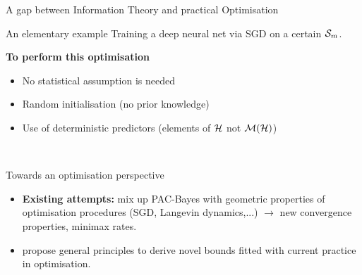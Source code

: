 \documentclass{presentation}
\begin{document}
\begin{xframe}{A gap between Information Theory and practical Optimisation}
    \begin{block}{An elementary example}
        Training a deep neural net via SGD on a certain $\mathcal{S}_m$.
    \end{block}
\vspace{0.5cm}
{\bf To perform this optimisation}
    \begin{itemize}
        \item No statistical assumption is needed
        \item Random initialisation (no prior knowledge)
        \item Use of deterministic predictors (elements of $\mathcal{H}$ not $\mathcal{M}(\mathcal{H})$)
    \end{itemize}
    \vspace{0.5cm}
    \\
    \vspace{0.5cm}
\end{xframe}

\begin{xframe}{Towards an optimisation perspective}
    \vspace{1cm}
    \begin{itemize}
        \item \textbf{Existing attempts:} mix up PAC-Bayes with geometric properties of optimisation procedures (SGD, Langevin dynamics,...)  \citep{london2017pac,dziugaite2018entropy,neu2021info,clerico2022generalisation,haghifam2023limit,zhou2023toward} $\rightarrow$ new convergence properties, minimax rates.
        \item {} propose general principles to derive novel bounds fitted with current practice in optimisation.
    \end{itemize}
    \vspace{0.5cm}



\end{xframe}
\end{document}
